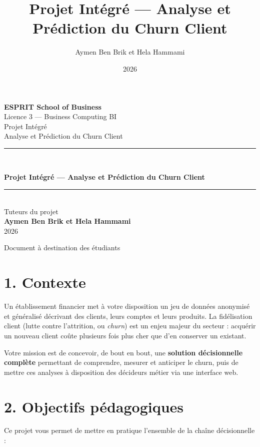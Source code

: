 \documentclass[11pt,a4paper]{article}
\title{\color{primary}\textbf{Projet Intégré --- Analyse et Prédiction
du Churn Client}}
\author{Aymen Ben Brik et Hela Hammami}
\date{2026}
\begin{document}
\begin{titlepage}
\centering
\vspace*{1.5cm}

{\Large\bfseries ESPRIT School of Business}\\[0.3cm]
{\large Licence 3 --- Business Computing BI}\\[2cm]

{\color{gray}\large Projet Intégré}\\[0.3cm]
{\color{gray}\large Analyse et Prédiction du Churn Client}\\[2.2cm]

\rule{0.85\linewidth}{1.2pt}\\[0.6cm]
{\Huge\bfseries\color{primary} Projet Intégré --- Analyse et Prédiction
du Churn Client\par}
\rule{0.85\linewidth}{1.2pt}\\[2cm]

{\large Tuteurs du projet}\\[0.2cm]
{\Large\bfseries Aymen Ben Brik et Hela Hammami}\\[1cm]
{\large 2026}

\vfill
{\color{gray}\small Document à destination des étudiants}
\end{titlepage}

\tableofcontents
\newpage

\section{1. Contexte}\label{contexte}

Un établissement financier met à votre disposition un jeu de données
anonymisé et généralisé décrivant des clients, leurs comptes et leurs
produits. La fidélisation client (lutte contre l'attrition, ou
\emph{churn}) est un enjeu majeur du secteur : acquérir un nouveau
client coûte plusieurs fois plus cher que d'en conserver un existant.

Votre mission est de concevoir, de bout en bout, une \textbf{solution
décisionnelle complète} permettant de comprendre, mesurer et anticiper
le churn, puis de mettre ces analyses à disposition des décideurs métier
via une interface web.

\section{2. Objectifs pédagogiques}\label{objectifs-puxe9dagogiques}

Ce projet vous permet de mettre en pratique l'ensemble de la chaîne
décisionnelle :
\end{document}
